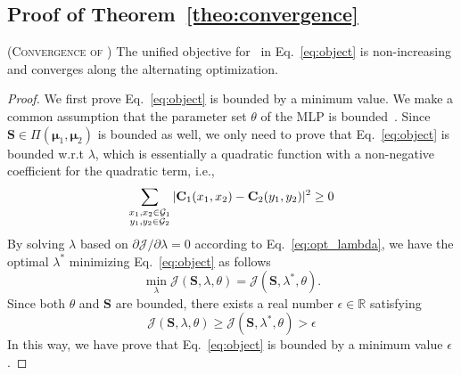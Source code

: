 \subsection{Proof of Theorem~\ref{theo:convergence}}
\begin{theorem*}
    {\normalfont \textsc{(Convergence of \algname)}} The unified objective for \algname\ in Eq.~\eqref{eq:object} is non-increasing and converges along the alternating optimization.
\end{theorem*}
\begin{proof}
    We first prove Eq.~\eqref{eq:object} is bounded by a minimum value. We make a common assumption that the parameter set $\theta$ of the MLP is bounded~\cite{slotalign}. Since $\mathbf{S}\in\Pi(\bm{\mu}_1,\bm{\mu}_2)$ is bounded as well, we only need to prove that Eq.~\eqref{eq:object} is bounded w.r.t $\lambda$, which is essentially a quadratic function with a non-negative coefficient for the quadratic term, i.e.,
    \begin{equation*}
        \sum_{\substack{x_1,x_2\in\mathcal{G}_1\\y_1,y_2\in\mathcal{G}_2}}|\mathbf{C}_1(x_1,x_2)-\mathbf{C}_2(y_1,y_2)|^2 \geq 0
    \end{equation*}
    By solving $\lambda$ based on $\partial \mathcal{J}/\partial \lambda=0$ according to Eq.~\eqref{eq:opt_lambda}, we have the optimal $\lambda^*$ minimizing Eq.~\eqref{eq:object} as follows
    \begin{equation*}
        \min\limits_{\lambda}\mathcal{J}(\mathbf{S},\lambda,\theta)=\mathcal{J}(\mathbf{S},\lambda^*,\theta).
    \end{equation*}
    Since both $\theta$ and $\mathbf{S}$ are bounded, there exists a real number $\epsilon\in\mathbb{R}$ satisfying
    \begin{equation*}
        \mathcal{J}(\mathbf{S},\lambda,\theta)\geq \mathcal{J}(\mathbf{S},\lambda^*,\theta)>\epsilon
    \end{equation*}
    In this way, we have prove that Eq.~\eqref{eq:object} is bounded by a minimum value $\epsilon$.
    

\end{proof}
